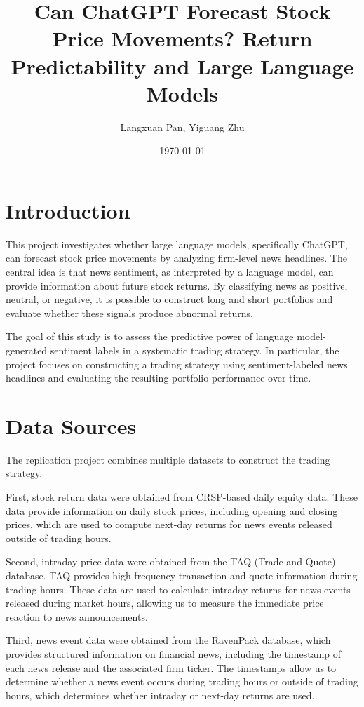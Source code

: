 \documentclass[11pt]{article}
\title{Can ChatGPT Forecast Stock Price Movements? Return Predictability and Large Language Models}
\author{Langxuan Pan, Yiguang Zhu}
\date{\today}
\begin{document}
\maketitle

\section{Introduction}

This project investigates whether large language models, specifically ChatGPT, can forecast stock price movements by analyzing firm-level news headlines. The central idea is that news sentiment, as interpreted by a language model, can provide information about future stock returns. By classifying news as positive, neutral, or negative, it is possible to construct long and short portfolios and evaluate whether these signals produce abnormal returns.

The goal of this study is to assess the predictive power of language model-generated sentiment labels in a systematic trading strategy. In particular, the project focuses on constructing a trading strategy using sentiment-labeled news headlines and evaluating the resulting portfolio performance over time.

\section{Data Sources}

The replication project combines multiple datasets to construct the trading strategy.

First, stock return data were obtained from CRSP-based daily equity data. These data provide information on daily stock prices, including opening and closing prices, which are used to compute next-day returns for news events released outside of trading hours.

Second, intraday price data were obtained from the TAQ (Trade and Quote) database. TAQ provides high-frequency transaction and quote information during trading hours. These data are used to calculate intraday returns for news events released during market hours, allowing us to measure the immediate price reaction to news announcements.

Third, news event data were obtained from the RavenPack database, which provides structured information on financial news, including the timestamp of each news release and the associated firm ticker. The timestamps allow us to determine whether a news event occurs during trading hours or outside of trading hours, which determines whether intraday or next-day returns are used.
\end{document}
